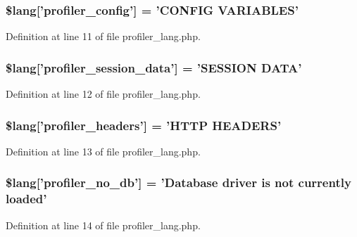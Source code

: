 \subsubsection[{\$lang}]{\setlength{\rightskip}{0pt plus 5cm}\$lang['profiler\-\_\-config'] = 'C\-O\-N\-F\-I\-G V\-A\-R\-I\-A\-B\-L\-E\-S'}\label{profiler__lang_8php_a68a43f2ac48abfc21cd12ee19e75e421}


Definition at line 11 of file profiler\-\_\-lang.\-php.

\subsubsection[{\$lang}]{\setlength{\rightskip}{0pt plus 5cm}\$lang['profiler\-\_\-session\-\_\-data'] = 'S\-E\-S\-S\-I\-O\-N D\-A\-T\-A'}\label{profiler__lang_8php_a6caa2b856b3211345f4a916febd79a84}


Definition at line 12 of file profiler\-\_\-lang.\-php.

\subsubsection[{\$lang}]{\setlength{\rightskip}{0pt plus 5cm}\$lang['profiler\-\_\-headers'] = 'H\-T\-T\-P H\-E\-A\-D\-E\-R\-S'}\label{profiler__lang_8php_a079eb6971dec0c6115344e4b621e235f}


Definition at line 13 of file profiler\-\_\-lang.\-php.

\subsubsection[{\$lang}]{\setlength{\rightskip}{0pt plus 5cm}\$lang['profiler\-\_\-no\-\_\-db'] = 'Database driver is {\bf not} currently loaded'}\label{profiler__lang_8php_a74da0e429477e757130da70e135d4ae9}


Definition at line 14 of file profiler\-\_\-lang.\-php.

